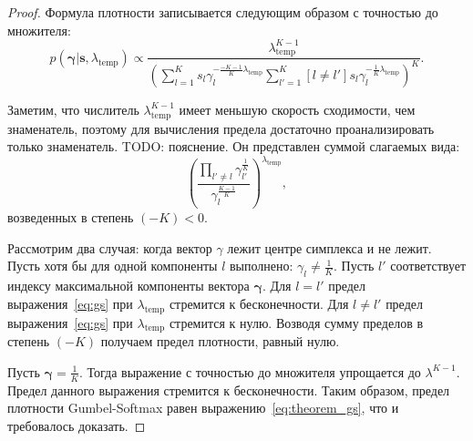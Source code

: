 \begin{proof} 
Формула плотности записывается следующим образом с точностью до множителя:
\[
    p(\boldsymbol{\gamma}|\mathbf{s}, {\lambda}_\text{temp}) \propto    \frac{\lambda_{\text{temp}}^{K-1}}{\left(\sum_{l=1}^K s_l\gamma_l^{-\frac{-K-1}{K}\lambda_\text{temp}}\sum_{l'=1}^K [l \neq l']s_l\gamma_l^{-\frac{1}{K}\lambda_\text{temp}}\right)^{K}}.
\]


Заметим, что числитель $\lambda_{\text{temp}}^{K-1}$ имеет меньшую скорость сходимости, чем знаменатель, поэтому для вычисления предела достаточно проанализировать только знаменатель. 
TODO: пояснение. Он представлен суммой слагаемых вида:
\begin{equation}
\label{eq:gs}
    \left(\frac{\prod_{l' \neq l} \gamma_{l'}^{\frac{1}{K}}}{\gamma_l^{\frac{K-1}{K}}}\right)^{\lambda_{\text{temp}}},
\end{equation}
возведенных в степень $(-K)<0.$

Рассмотрим два случая: когда вектор $\gamma$ лежит центре симплекса и не лежит. 
Пусть хотя бы для одной компоненты $l$ выполнено: $\gamma_l \neq \frac{1}{K}$. Пусть $l'$ соответствует индексу максимальной компоненты вектора $\boldsymbol{\gamma}$.
Для $l=l'$ предел выражения~\eqref{eq:gs} при $\lambda_{\text{temp}}$ стремится к бесконечности. Для $l\neq l'$ предел выражения~\eqref{eq:gs} при $\lambda_{\text{temp}}$ стремится к нулю. Возводя сумму пределов в степень $(-K)$ получаем предел плотности, равный нулю.

Пусть $\boldsymbol{\gamma} = \frac{1}{K}$.
Тогда выражение с точностью до множителя упрощается до $\lambda^{K-1}$. Предел данного выражения стремится к бесконечности.
Таким образом, предел плотности Gumbel-Softmax равен выражению~\eqref{eq:theorem_gs}, что и требовалось доказать.

\end{proof}


